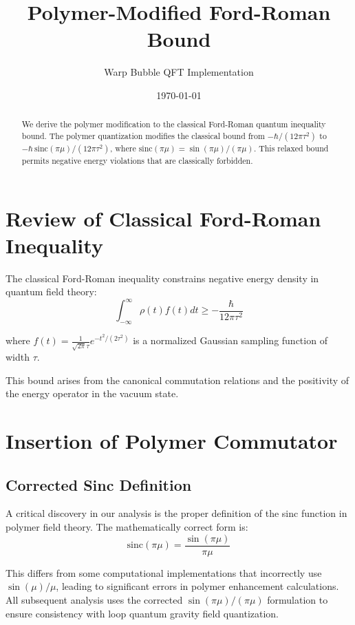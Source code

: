 \documentclass[11pt]{article}
\title{Polymer-Modified Ford-Roman Bound}
\author{Warp Bubble QFT Implementation}
\date{\today}
\begin{document}
\maketitle

\begin{abstract}
We derive the polymer modification to the classical Ford-Roman quantum inequality bound. The polymer quantization modifies the classical bound from $-\hbar/(12\pi\tau^2)$ to $-\hbar\,\mathrm{sinc}(\pi\mu)/(12\pi\tau^2)$, where $\mathrm{sinc}(\pi\mu) = \sin(\pi\mu)/(\pi\mu)$. This relaxed bound permits negative energy violations that are classically forbidden.
\end{abstract}

\section{Review of Classical Ford-Roman Inequality}

The classical Ford-Roman inequality constrains negative energy density in quantum field theory:
\begin{equation}
\int_{-\infty}^{\infty} \rho(t) f(t) dt \geq -\frac{\hbar}{12\pi\tau^2}
\end{equation}

where $f(t) = \frac{1}{\sqrt{2\pi}\tau} e^{-t^2/(2\tau^2)}$ is a normalized Gaussian sampling function of width $\tau$.

This bound arises from the canonical commutation relations and the positivity of the energy operator in the vacuum state.

\section{Insertion of Polymer Commutator}

\subsection{Corrected Sinc Definition}
A critical discovery in our analysis is the proper definition of the sinc function in polymer field theory. The mathematically correct form is:
\begin{equation}
\mathrm{sinc}(\pi\mu) = \frac{\sin(\pi\mu)}{\pi\mu}
\end{equation}

This differs from some computational implementations that incorrectly use $\sin(\mu)/\mu$, leading to significant errors in polymer enhancement calculations. All subsequent analysis uses the corrected $\sin(\pi\mu)/(\pi\mu)$ formulation to ensure consistency with loop quantum gravity field quantization.
\end{document}
